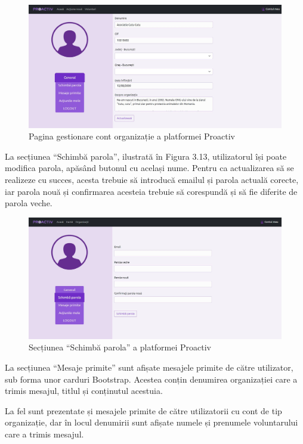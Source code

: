 \documentclass[12pt,a4paper]{report}
\begin{document}
\begin{figure}[H]
\centering
  \includegraphics[width=1\linewidth]{./imagini/cont1org.jpg}
  \caption{Pagina gestionare cont organizație a platformei Proactiv}
\end{figure}
\par
La secțiunea “Schimbă parola”, ilustrată în Figura 3.13, utilizatorul își poate modifica parola, apăsând butonul cu același nume. Pentru ca actualizarea să se realizeze cu succes, acesta trebuie să introducă emailul și parola actuală corecte, iar parola nouă și confirmarea acesteia trebuie să corespundă și să fie diferite de parola veche.
\\
\begin{figure}[H]
\centering
  \includegraphics[width=1\linewidth]{./imagini/cont2.jpg}
  \caption{Secțiunea “Schimbă parola” a platformei Proactiv}
\end{figure}
\newpage
La secțiunea “Mesaje primite” sunt afișate mesajele primite de către utilizator, sub forma unor carduri Bootstrap. Acestea conțin denumirea organizației care a trimis mesajul, titlul și conținutul acestuia.
\par
La fel sunt prezentate și mesajele primite de către utilizatorii cu cont de tip organizație, dar în locul denumirii sunt afișate numele și prenumele voluntarului care a trimis mesajul.
\end{document}
